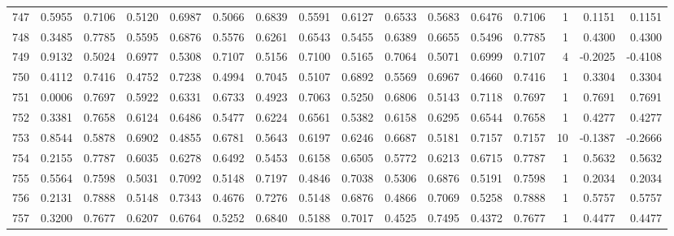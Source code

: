 \begin{tabular}{lrrrrrrrrrrrrrrr}
747 &      0.5955 &  0.7106 &  0.5120 &  0.6987 &  0.5066 &  0.6839 &  0.5591 &  0.6127 &  0.6533 &  0.5683 &   0.6476 &     0.7106 &      1 &                    0.1151 &                     0.1151 \\
748 &      0.3485 &  0.7785 &  0.5595 &  0.6876 &  0.5576 &  0.6261 &  0.6543 &  0.5455 &  0.6389 &  0.6655 &   0.5496 &     0.7785 &      1 &                    0.4300 &                     0.4300 \\
749 &      0.9132 &  0.5024 &  0.6977 &  0.5308 &  0.7107 &  0.5156 &  0.7100 &  0.5165 &  0.7064 &  0.5071 &   0.6999 &     0.7107 &      4 &                   -0.2025 &                    -0.4108 \\
750 &      0.4112 &  0.7416 &  0.4752 &  0.7238 &  0.4994 &  0.7045 &  0.5107 &  0.6892 &  0.5569 &  0.6967 &   0.4660 &     0.7416 &      1 &                    0.3304 &                     0.3304 \\
751 &      0.0006 &  0.7697 &  0.5922 &  0.6331 &  0.6733 &  0.4923 &  0.7063 &  0.5250 &  0.6806 &  0.5143 &   0.7118 &     0.7697 &      1 &                    0.7691 &                     0.7691 \\
752 &      0.3381 &  0.7658 &  0.6124 &  0.6486 &  0.5477 &  0.6224 &  0.6561 &  0.5382 &  0.6158 &  0.6295 &   0.6544 &     0.7658 &      1 &                    0.4277 &                     0.4277 \\
753 &      0.8544 &  0.5878 &  0.6902 &  0.4855 &  0.6781 &  0.5643 &  0.6197 &  0.6246 &  0.6687 &  0.5181 &   0.7157 &     0.7157 &     10 &                   -0.1387 &                    -0.2666 \\
754 &      0.2155 &  0.7787 &  0.6035 &  0.6278 &  0.6492 &  0.5453 &  0.6158 &  0.6505 &  0.5772 &  0.6213 &   0.6715 &     0.7787 &      1 &                    0.5632 &                     0.5632 \\
755 &      0.5564 &  0.7598 &  0.5031 &  0.7092 &  0.5148 &  0.7197 &  0.4846 &  0.7038 &  0.5306 &  0.6876 &   0.5191 &     0.7598 &      1 &                    0.2034 &                     0.2034 \\
756 &      0.2131 &  0.7888 &  0.5148 &  0.7343 &  0.4676 &  0.7276 &  0.5148 &  0.6876 &  0.4866 &  0.7069 &   0.5258 &     0.7888 &      1 &                    0.5757 &                     0.5757 \\
757 &      0.3200 &  0.7677 &  0.6207 &  0.6764 &  0.5252 &  0.6840 &  0.5188 &  0.7017 &  0.4525 &  0.7495 &   0.4372 &     0.7677 &      1 &                    0.4477 &                     0.4477 \\

\end{tabular}
